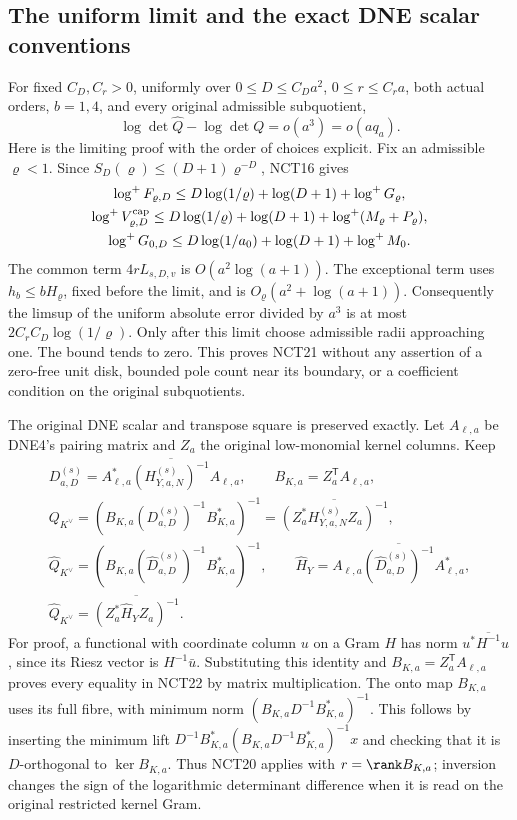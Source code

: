 \documentclass[11pt,a4paper]{article}
\begin{document}
\subsection{The uniform limit and the exact DNE scalar conventions}

For fixed \(C_D,C_r>0\), uniformly over
\(0\le D\le C_Da^2\), \(0\le r\le C_ra\), both actual
orders, \(b=1,4\), and every original admissible subquotient,
\[
 \log\det\widehat Q-\log\det Q=o(a^3)=o(aq_a).
 \tag{NCT21}
\]
Here is the limiting proof with the order of choices explicit.
Fix an admissible \(\varrho<1\).  Since
\(S_D(\varrho)\le(D+1)\varrho^{-D}\), NCT16 gives
\[
\begin{gathered}
 \log^+F_{\varrho,D}
     \le D\log(1/\varrho)+\log(D+1)+\log^+G_\varrho,\\
 \log^+V_{\varrho,D}^{\rm cap}
     \le D\log(1/\varrho)+\log(D+1)+\log^+(M_\varrho+P_\varrho),\\
 \log^+G_{0,D}
     \le D\log(1/a_0)+\log(D+1)+\log^+M_0.
\end{gathered}
\]
The common term \(4rL_{s,D,v}\) is \(O(a^2\log(a+1))\).
The exceptional term uses \(h_b\le bH_\varrho\), fixed before
the limit, and is \(O_\varrho(a^2+\log(a+1))\).
Consequently the limsup of the uniform absolute error divided
by \(a^3\) is at most \(2C_rC_D\log(1/\varrho)\).
Only after this limit choose admissible radii approaching one.
The bound tends to zero.  This proves NCT21 without any assertion
of a zero-free unit disk, bounded pole count near its boundary,
or a coefficient condition on the original subquotients.

The original DNE scalar and transpose square is preserved exactly.
Let \(A_{\ell,a}\) be DNE4's pairing matrix and \(Z_a\) the
original low-monomial kernel columns.  Keep
\[
\begin{gathered}
 D_{a,D}^{(s)}=A_{\ell,a}^*\overline{(H_{Y,a,N}^{(s)})^{-1}}A_{\ell,a},
 \qquad B_{K,a}=Z_a^{\mathsf T}A_{\ell,a},\\
 Q_{K^\vee}=(B_{K,a}(D_{a,D}^{(s)})^{-1}B_{K,a}^*)^{-1}
             =\overline{(Z_a^*H_{Y,a,N}^{(s)}Z_a)^{-1}},\\
 \widehat Q_{K^\vee}
       =(B_{K,a}(\widehat D_{a,D}^{(s)})^{-1}B_{K,a}^*)^{-1},
 \qquad
 \widehat H_Y=\overline{A_{\ell,a}(\widehat D_{a,D}^{(s)})^{-1}
                                     A_{\ell,a}^*},\\
 \widehat Q_{K^\vee}=\overline{(Z_a^*\widehat H_YZ_a)^{-1}}.
\end{gathered}\tag{NCT22}
\]
For proof, a functional with coordinate column \(u\) on a Gram
\(H\) has norm \(u^*\overline{H^{-1}}u\), since its Riesz
vector is \(H^{-1}\bar u\).  Substituting this identity and
\(B_{K,a}=Z_a^{\mathsf T}A_{\ell,a}\) proves every equality
in NCT22 by matrix multiplication.  The onto map \(B_{K,a}\)
uses its full fibre, with minimum norm
\((B_{K,a}D^{-1}B_{K,a}^*)^{-1}\).  This follows by inserting
the minimum lift \(D^{-1}B_{K,a}^*(B_{K,a}D^{-1}B_{K,a}^*)^{-1}x\)
and checking that it is \(D\)-orthogonal to \(\ker B_{K,a}\).
Thus NCT20 applies with \(r=\rank B_{K,a}\); inversion changes
the sign of the logarithmic determinant difference when it is
read on the original restricted kernel Gram.
\end{document}
